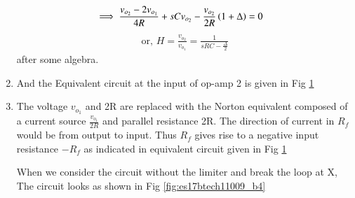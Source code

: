 \begin{enumerate}[label=\arabic*.,ref=\theenumi]
\begin{align}
\implies \frac{v_{o_2} - 2v_{o_1}}{4R} + sCv_{o_2} -  \frac{v_{o_2}}{2R}\left(1 + \Delta\right) &= 0
\end{align}
\begin{align}
\text{or, }    H = \frac{v_{o_2}}{v_{o_1}}= \frac{1}{sRC - \frac{\Delta}{2}}
    \label{eq:es17btech11009_H}
\end{align}
after some algebra.
%

\item
And the Equivalent circuit at the input of op-amp 2 is given in Fig \ref{fig:es17btech11009_fig2}
\renewcommand{\thefigure}{\theenumi.\arabic{figure}}
\begin{figure}[!ht]
	\begin{center}
		\resizebox{\columnwidth}{!}{}
	\end{center}
\caption{}
\label{fig:es17btech11009_fig2}
\end{figure}
\item 
\solution The voltage $v_{o_1}$ and 2R are replaced with the Norton equivalent composed of a current source $\frac{v_{o_1}}{2R}$ and parallel resistance 2R. The direction of current in $R_{f}$ would be from output to input. Thus $R_{f}$ gives rise to a negative input resistance $-R_{f}$ as indicated in equivalent circuit given in Fig \ref{fig:es17btech11009_fig2}

When we consider the circuit without the limiter and break the loop at X, The circuit looks as shown in Fig \ref{fig:es17btech11009_b4}
\renewcommand{\thefigure}{\theenumi.\arabic{figure}}


\end{enumerate}
